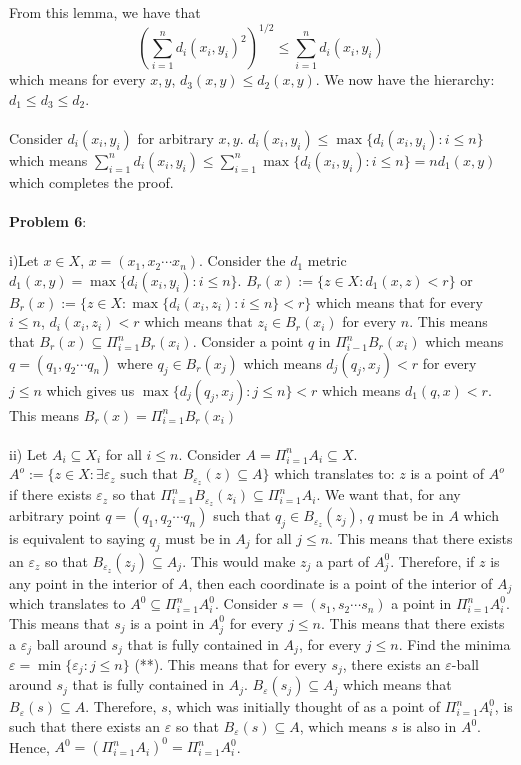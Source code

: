 \documentclass[../Main.tex]{subfiles}
\begin{document}
From this lemma, we have that $$(\sum_{i=1}^n d_i(x_i,y_i)^2 )^{1/2} \leq \sum_{i=1}^n d_i(x_i,y_i) $$
which means for every $x,y$, $d_3(x,y) \leq d_2(x,y)$. We now have the hierarchy: $d_1 \leq d_3 \leq d_2$. 
\\\\ Consider $d_i(x_i,y_i)$ for arbitrary $x,y$. $d_i(x_i,y_i) \leq \max\{d_i(x_i,y_i):i \leq n\}$ which means $\sum_{i=1}^n d_i(x_i,y_i) \leq \sum_{i=1}^n \max\{d_i(x_i,y_i):i \leq n\}=nd_1(x,y)$ which completes the proof.
\\\\ \textbf{Problem 6}:
\\\\ i)Let $x \in X$, $x=(x_1,x_2 \cdots x_n)$. Consider the $d_1$ metric $d_1(x,y)=\max\{d_i(x_i,y_i): i \leq n\}$. $B_{r}(x):=\{z \in X: d_1(x,z)<r\}$ or $B_r(x):=\{z \in X: \max\{d_i(x_i,z_i):i \leq n\}<r\}$ which means that for every $i \leq n$, $d_i(x_i,z_i)<r$ which means that $z_i \in B_r(x_i)$ for every $n$. This means that $B_r(x) \subseteq \Pi_{i=1}^n B_r(x_i)$. Consider a point $q$ in $\Pi_{i-1}^n B_r(x_i)$ which means $q=(q_1,q_2 \cdots q_n)$ where $q_j \in B_r(x_j)$ which means $d_j(q_j,x_j)<r$ for every $j \leq n$ which gives us $\max\{d_j(q_j,x_j):j \leq n\}<r$ which means $d_1(q,x)<r$. This means $B_r(x) =\Pi_{i=1}^n B_r(x_i)$
\\\\ ii) Let $A_i \subseteq X_i$ for all $i \leq n$. Consider $A=\Pi_{i=1}^n A_i \subseteq X$. $A^o:=\{z \in X: \exists \varepsilon_z \text{ such that }B_{\varepsilon_z}(z) \subseteq A\}$ which translates to: $z$ is a point of $A^o$ if there exists $\varepsilon_z$ so that $\Pi_{i=1}^nB_{\varepsilon_z}(z_i) \subseteq \Pi_{i=1}^n A_i$. We want that, for any arbitrary point $q=(q_1,q_2 \cdots q_n)$ such that $q_j \in B_{\varepsilon_z}(z_j)$, $q$ must be in $A$ which is equivalent to saying $q_j$ must be in $A_j$ for all $j \leq n$. This means that there exists an $\varepsilon_z$ so that $B_{\varepsilon_z}(z_j) \subseteq A_j$. This would make $z_j$ a part of $A_j^0$. Therefore, if $z$ is any point in the interior of $A$, then each coordinate is a point of the interior of $A_j$ which translates to $A^0 \subseteq \Pi_{i=1}^n A_i^0$. Consider $s=(s_1,s_2\cdots s_n)$ a point in $\Pi_{i=1}^n A_i^0$. 
\\ This means that $s_j$ is a point in $A_j^0$ for every $j \leq n$. This means that there exists a $\varepsilon_j$ ball around $s_j$ that is fully contained in $A_j$, for every $j \leq n$. Find the minima $\varepsilon=\min\{\varepsilon_j: j \leq n\}$ (**). This means that for every $s_j$, there exists an $\varepsilon$-ball around $s_j$ that is fully contained in $A_j$. $B_{\varepsilon}(s_j) \subseteq A_j$ which means that $B_{\varepsilon}(s) \subseteq A$. Therefore, $s$, which was initially thought of as a point of $\Pi_{i=1}^nA_i^0$, is such that there exists an $\varepsilon$ so that $B_{\varepsilon}(s)\subseteq A$, which means $s$ is also in $A^0$. Hence, $A^0=(\Pi_{i=1}^n A_i)^0=\Pi_{i=1}^n A_i^0$.
\end{document}

